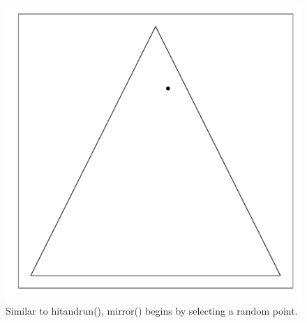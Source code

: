 \documentclass{article}\usepackage{graphicx, color}
\makeatletter
\def\maxwidth{ %
  \ifdim\Gin@nat@width>\linewidth
    \linewidth
  \else
    \Gin@nat@width
  \fi
}
\newenvironment{knitrout}{}{} %
\makeatother
\begin{document}
\begin{figure}[H]
\begin{knitrout}
\color{fgcolor}
\includegraphics[width=\maxwidth]{figure/mirror_walkthrough1} 

\end{knitrout}

\caption{Similar to hitandrun(), mirror() begins by selecting a random point.}
\end{figure}
\end{document}
